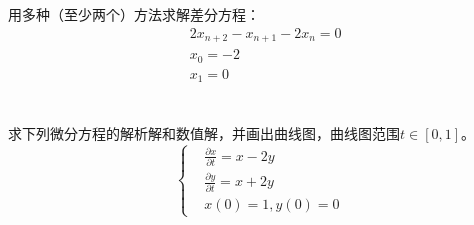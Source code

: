 \chapter{}

用多种（至少两个）方法求解差分方程：
\begin{equation*}
    \begin{split}
        &2x_{n+2} - x_{n+1} - 2x_n = 0\\
        &x_0 = -2\\
        &x_1 = 0
    \end{split}
\end{equation*}

\chapter{}
求下列微分方程的解析解和数值解，并画出曲线图，曲线图范围$t\in[0,1]$。
\begin{equation*}
    \left \{
        \begin{aligned}
            &\frac{\partial x}{\partial t} = x - 2y\\
            &\frac{\partial y}{\partial t} = x + 2y\\
            &x(0)=1, y(0) = 0
        \end{aligned}
    \right . 
\end{equation*}